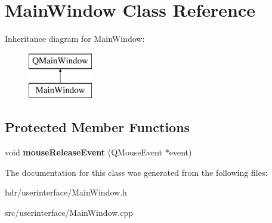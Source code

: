\section{Main\-Window Class Reference}
\label{class_main_window}
Inheritance diagram for Main\-Window\-:\begin{figure}[H]
\begin{center}
\leavevmode
\includegraphics[height=2.000000cm]{class_main_window}
\end{center}
\end{figure}
\subsection*{Protected Member Functions}
\begin{DoxyCompactItemize}
\item 
void {\bfseries mouse\-Release\-Event} (Q\-Mouse\-Event $\ast$event)\label{class_main_window_a32bbb036a55856e49c31a5348f937b53}

\end{DoxyCompactItemize}


The documentation for this class was generated from the following files\-:\begin{DoxyCompactItemize}
\item 
hdr/userinterface/Main\-Window.\-h\item 
src/userinterface/Main\-Window.\-cpp\end{DoxyCompactItemize}
